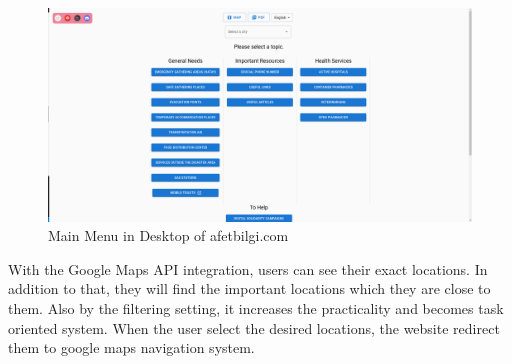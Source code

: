 \begin{figure}[H]
    \begin{center}
        \includegraphics[scale = 0.18]{assets/desktopInterface.png}
        \caption[Main Menu in Desktop]{Main Menu in Desktop of afetbilgi.com}
    \end{center}
\end{figure}

With the Google Maps API integration, users can see their exact locations. In addition to that, they will find the important locations which they are close to them. Also by the filtering setting, it increases the practicality and becomes task oriented system. When the user select the desired locations, the website redirect them to google maps navigation system. 

